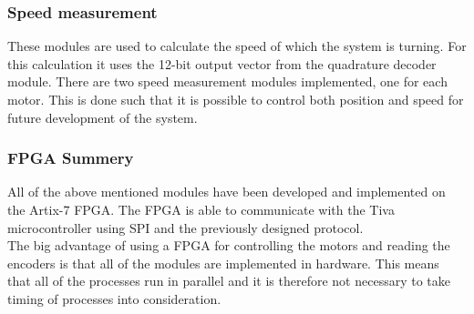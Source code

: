 \documentclass[../../../main]{subfiles}
\begin{document}
\subsubsection{Speed measurement}
These modules are used to calculate the speed of which the system is turning. For this calculation it uses the 12-bit output vector from the quadrature decoder module.
There are two speed measurement modules implemented, one for each motor.
This is done such that it is possible to control both position and speed for future development of the system.

\subsubsection{FPGA Summery}
All of the above mentioned modules have been developed and implemented on the Artix-7 FPGA.
The FPGA is able to communicate with the Tiva microcontroller using SPI and the previously designed protocol.
\\
The big advantage of using a FPGA for controlling the motors and reading the encoders is that all of the modules are implemented in hardware.
This means that all of the processes run in parallel and it is therefore not necessary to take timing of processes into consideration.
\end{document}
